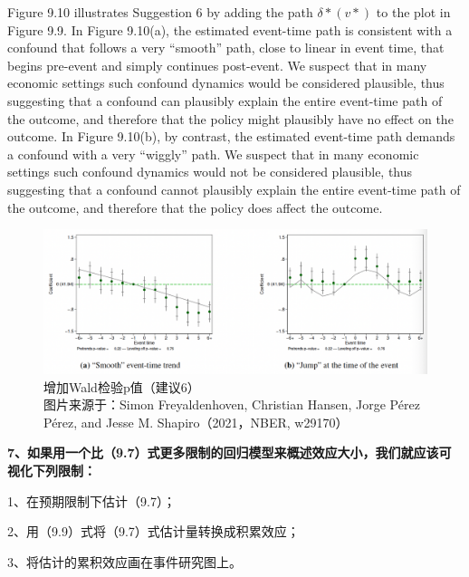 \documentclass[cn,12pt,math=newtx,citestyle=gb7714-2015,bibstyle=gb7714-2015]{elegantbook}
\begin{document}
	Figure 9.10 illustrates Suggestion 6 by adding the path $\delta*(v*)$ to the plot in Figure 9.9. In Figure 9.10(a), the estimated event-time path is consistent with a confound that follows a very “smooth” path, close to linear in event time, that begins pre-event and simply continues post-event. We suspect that in many economic settings such confound dynamics would be considered plausible, thus suggesting that a confound can plausibly explain the entire event-time path of the outcome, and therefore that the policy might plausibly have no effect on the outcome. In Figure 9.10(b), by contrast, the estimated event-time path demands a confound with a very “wiggly” path. We suspect that in many economic settings such confound dynamics would not be considered plausible, thus suggesting that a confound cannot plausibly explain the entire event-time path of the outcome, and therefore that the policy does affect the outcome.
	
	\begin{figure}[tbph]
		\centering
		\includegraphics[width=1\linewidth]{sug6}
		\caption{增加Wald检验p值（建议6）\\ 图片来源于：Simon Freyaldenhoven, Christian Hansen, Jorge Pérez Pérez, and Jesse M. Shapiro（2021，NBER, w29170）}
		\label{fig:sug6}
	\end{figure}
		
			\textbf{7、如果用一个比（9.7）式更多限制的回归模型来概述效应大小，我们就应该可视化下列限制：}

            1、在预期限制下估计（9.7）；
            
            2、用（9.9）式将（9.7）式估计量转换成积累效应；
            
            3、将估计的累积效应画在事件研究图上。
\end{document}

